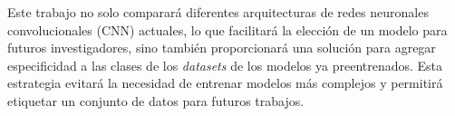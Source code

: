 Este trabajo no solo comparará diferentes arquitecturas 
de redes neuronales convolucionales (CNN) actuales, lo que facilitará la 
elección de un modelo para futuros investigadores, sino también proporcionará 
una solución para agregar especificidad a las clases de los \textit{datasets} 
de los modelos ya preentrenados. Esta estrategia evitará la necesidad de 
entrenar modelos más complejos y permitirá etiquetar un conjunto de datos 
para futuros trabajos.